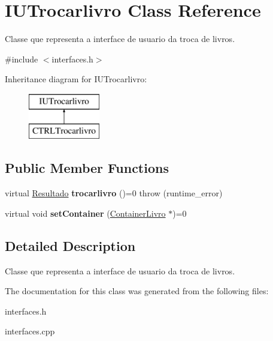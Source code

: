 \hypertarget{classIUTrocarlivro}{}\section{I\+U\+Trocarlivro Class Reference}
\label{classIUTrocarlivro}


Classe que representa a interface de usuario da troca de livros.  




{\ttfamily \#include $<$interfaces.\+h$>$}

Inheritance diagram for I\+U\+Trocarlivro\+:\begin{figure}[H]
\begin{center}
\leavevmode
\includegraphics[height=2.000000cm]{classIUTrocarlivro}
\end{center}
\end{figure}
\subsection*{Public Member Functions}
\begin{DoxyCompactItemize}
\item 
\mbox{\label{classIUTrocarlivro_aedae37ad25cc9af5a18fcb8afd5f987f}} 
virtual \hyperlink{classResultado}{Resultado} {\bfseries trocarlivro} ()=0  throw (runtime\+\_\+error)
\item 
\mbox{\label{classIUTrocarlivro_acfae9cd5977eb34ae9fbe0bbe70c3025}} 
virtual void {\bfseries set\+Container} (\hyperlink{classContainerLivro}{Container\+Livro} $\ast$)=0
\end{DoxyCompactItemize}


\subsection{Detailed Description}
Classe que representa a interface de usuario da troca de livros. 

The documentation for this class was generated from the following files\+:\begin{DoxyCompactItemize}
\item 
interfaces.\+h\item 
interfaces.\+cpp\end{DoxyCompactItemize}
